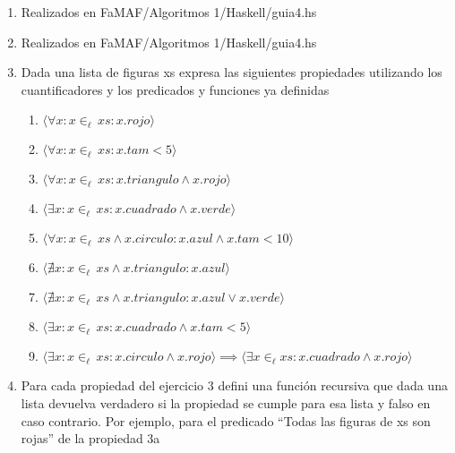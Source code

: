 \documentclass[12pt]{article} %
\begin{document}
\begin{enumerate}
    \item Realizados en FaMAF/Algoritmos 1/Haskell/guia4.hs
    \item Realizados en FaMAF/Algoritmos 1/Haskell/guia4.hs
    \item Dada una lista de figuras xs expresa las siguientes propiedades utilizando los cuantificadores y los predicados y funciones ya definidas
    \begin{enumerate}
        \item \( \langle \forall x : x \in_\ell  \, xs : x.rojo  \rangle \)
        \item \( \langle \forall x : x \in_\ell  \, xs : x.tam < 5  \rangle \)
        \item \( \langle \forall x : x \in_\ell  \, xs : x.triangulo \land x.rojo  \rangle \)
        \item \( \langle \exists x : x \in_\ell  \, xs : x.cuadrado \land x.verde  \rangle \)
        \item \( \langle \forall x : x \in_\ell  \, xs \land x.circulo : x.azul \land x.tam < 10 \rangle \)
        \item \( \langle \nexists x : x \in_\ell  \, xs \land x.triangulo : x.azul  \rangle \)
        \item \( \langle \nexists x : x \in_\ell  \, xs \land x.triangulo : x.azul \lor x.verde \rangle \)
        \item \( \langle \exists x : x \in_\ell  \, xs : x.cuadrado \land x.tam < 5  \rangle \)
        \item \( \langle \exists x : x \in_\ell  \, xs : x.circulo \land x.rojo  \rangle \implies \langle \exists x \in_\ell xs : x.cuadrado \land x.rojo \rangle \) 
    \end{enumerate}

    \pagebreak

    \item Para cada propiedad del ejercicio 3 defini una función recursiva que dada una lista devuelva verdadero si
    la propiedad se cumple para esa lista y falso en caso contrario. Por ejemplo, para el predicado “Todas las
    figuras de xs son rojas” de la propiedad 3a


\end{enumerate}
\end{document}
